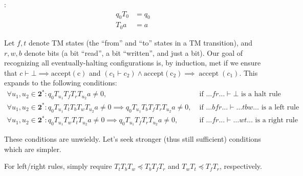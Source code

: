 
:
\begin{align}
  q_0 T_0 &= q_0
  \label{far-cond-leading-0}
  \\
  T_0 a &= a
  \label{far-cond-trailing-0}
\end{align}

Let $f,t$ denote TM states (the ``from'' and ``to'' states in a TM transition), and $r,w,b$ denote bits (a bit ``read'', a bit ``written'', and just a bit).
Our goal of recognizing all eventually-halting configurations is, by induction, met if we ensure that $c\vdash\bot\implies\operatorname{accept(c)}$
and $(c_1\vdash c_2)\land\operatorname{accept(c_2)}\implies\operatorname{accept}(c_1)$.
This expands to the following conditions:
\begin{align*}
  \forall u_1,u_2\in\mathbf{2}^*: q_0 T_{u_1} T_f T_r T_{u_2} a \ne 0,\;& \text{if $\ldots fr\ldots\vdash\bot$ is a halt rule}
  \\
  \forall u_1,u_2\in\mathbf{2}^*: q_0 T_{u_1} T_t T_b T_w T_{u_2} a \ne 0 \implies q_0 T_{u_1} T_b T_f T_r T_{u_2} a \ne 0,\;& \text{if $\ldots bfr\ldots\vdash\ldots tbw\ldots$ is a left rule}
  \\
  \forall u_1,u_2\in\mathbf{2}^*: q_0 T_{u_1} T_w T_t T_{u_2} a \ne 0 \implies q_0 T_{u_1} T_f T_r T_{u_2} a \ne 0,\;& \text{if $\ldots fr\ldots\vdash\ldots wt\ldots$ is a right rule}
\end{align*}

These conditions are unwieldy. Let's seek stronger (thus still sufficient) conditions which are simpler.

For left/right rules, simply require $T_t T_b T_w\preceq T_b T_f T_r$ and $T_w T_t\preceq T_f T_r$, respectively.

